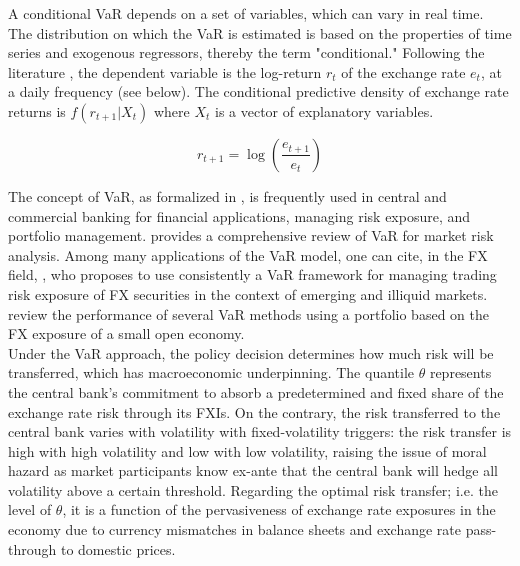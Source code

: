 \documentclass[11pt]{article}
\begin{document}
A conditional VaR depends on a set  of variables, which can vary in real time.
The distribution on which  the VaR is estimated is based  on the properties of
time  series  and  exogenous   regressors,  thereby  the  term  "conditional."
Following  the literature  \citep{sarno2003},  the dependent  variable is  the
log-return $r_t$ of the exchange rate $e_t$, at a daily frequency (see below).
The   conditional   predictive   density   of   exchange   rate   returns   is
$f(r_{t+1}|X_t)$ where $X_t$ is a vector of explanatory variables.

\begin{equation*}
  r_{t+1} = \log\left(\frac{e_{t+1}}{e_t}\right)
\end{equation*}


The concept of VaR, as formalized  in \cite{jorion2007}, is frequently used in
central  and  commercial banking  for  financial  applications, managing  risk
exposure,   and  portfolio   management.    \cite{alexander2009}  provides   a
comprehensive review of VaR for  market risk analysis. Among many applications
of the  VaR model,  one can  cite, in the  FX field,  \cite{aljanabi2006}, who
proposes  to  use consistently  a  VaR  framework  for managing  trading  risk
exposure  of   FX  securities  in   the  context  of  emerging   and  illiquid
markets. \cite{bredin2004} review the performance of several VaR methods using
a portfolio based on the FX exposure of a small open economy.\\


Under the VaR  approach, the policy decision determines how  much risk will be
transferred,  which has  macroeconomic  underpinning.   The quantile  $\theta$
represents the central  bank's commitment to absorb a  predetermined and fixed
share of the exchange  rate risk through its FXIs.  On  the contrary, the risk
transferred to the  central bank varies with  volatility with fixed-volatility
triggers: the  risk transfer  is high  with high volatility  and low  with low
volatility,  raising the  issue of  moral hazard  as market  participants know
ex-ante  that the  central  bank will  hedge all  volatility  above a  certain
threshold. Regarding the optimal risk transfer; i.e. the level of $\theta$, it
is a function  of the pervasiveness of exchange rate  exposures in the economy
due to currency mismatches in balance sheets and exchange rate pass-through to
domestic prices.\\
\end{document}
